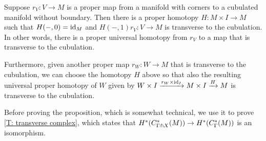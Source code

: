 \begin{proposition}\label{P: ball stability}
	Suppose $r_V \colon V \to M$ is a proper map from a manifold with corners to a cubulated manifold without boundary.
	Then there is a proper homotopy $H \colon M \times I \to M$ such that $H(-,0) = \mathrm{id}_M$ and $H(-,1) r_V \colon V \to M$ is transverse to the cubulation.
	In other words, there is a proper universal homotopy from $r_V$ to a map that is transverse to the cubulation.

	Furthermore, given another proper map $r_W \colon W \to M$ that is transverse to the cubulation, we can choose the homotopy $H$ above so that also the resulting universal proper homotopy of $W$ given by $W \times I \xrightarrow{r_W \times \mathrm{id}_I} M \times I \xrightarrow{H} M$ is transverse to the cubulation.
\end{proposition}

Before proving the proposition, which is somewhat technical, we use it to prove \cref{T: transverse complex}, which states that $H^*(C^*_{\Gamma \pitchfork X}(M)) \to H^*(C_\Gamma^*(M))$ is an isomorphism.

